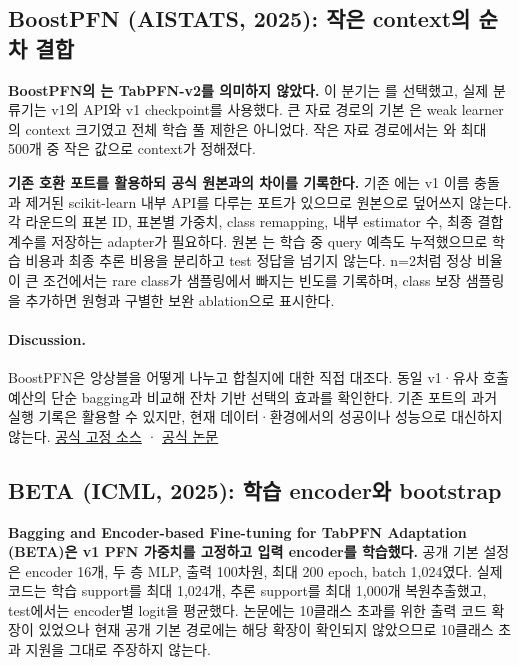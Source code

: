 \subsection{BoostPFN (AISTATS, 2025): 작은 context의 순차 결합}
\textbf{BoostPFN의 는 TabPFN-v2를 의미하지 않았다.} 이 분기는 를 선택했고, 실제 분류기는 v1의  API와 v1 checkpoint를 사용했다. 큰 자료 경로의 기본 은 weak learner의 context 크기였고 전체 학습 풀 제한은 아니었다. 작은 자료 경로에서는 와 최대 500개 중 작은 값으로 context가 정해졌다.

\textbf{기존 호환 포트를 활용하되 공식 원본과의 차이를 기록한다.} 기존 에는 v1 이름 충돌과 제거된 scikit-learn 내부 API를 다루는 포트가 있으므로 원본으로 덮어쓰지 않는다. 각 라운드의 표본 ID, 표본별 가중치, class remapping, 내부 estimator 수, 최종 결합 계수를 저장하는 adapter가 필요하다. 원본 는 학습 중 query 예측도 누적했으므로 학습 비용과 최종 추론 비용을 분리하고 test 정답을 넘기지 않는다. n=2처럼 정상 비율이 큰 조건에서는 rare class가 샘플링에서 빠지는 빈도를 기록하며, class 보장 샘플링을 추가하면 원형과 구별한 보완 ablation으로 표시한다.

\paragraph{Discussion.}
BoostPFN은 앙상블을 어떻게 나누고 합칠지에 대한 직접 대조다. 동일 v1·유사 호출 예산의 단순 bagging과 비교해 잔차 기반 선택의 효과를 확인한다. 기존 포트의 과거 실행 기록은 활용할 수 있지만, 현재 데이터·환경에서의 성공이나 성능으로 대신하지 않는다.
\href{https://github.com/yxzwang/BoostPFN/tree/c957ac2af8d4f308f13a5b1061b4a6eb37945030}{공식 고정 소스} · \href{https://proceedings.mlr.press/v258/wang25d.html}{공식 논문}

\subsection{BETA (ICML, 2025): 학습 encoder와 bootstrap}
\textbf{Bagging and Encoder-based Fine-tuning for TabPFN Adaptation (BETA)은 v1 PFN 가중치를 고정하고 입력 encoder를 학습했다.} 공개 기본 설정은 encoder 16개, 두 층 MLP, 출력 100차원, 최대 200 epoch, batch 1,024였다. 실제 코드는 학습 support를 최대 1,024개, 추론 support를 최대 1,000개 복원추출했고, test에서는 encoder별 logit을 평균했다. 논문에는 10클래스 초과를 위한 출력 코드 확장이 있었으나 현재 공개 기본  경로에는 해당 확장이 확인되지 않았으므로 10클래스 초과 지원을 그대로 주장하지 않는다.

